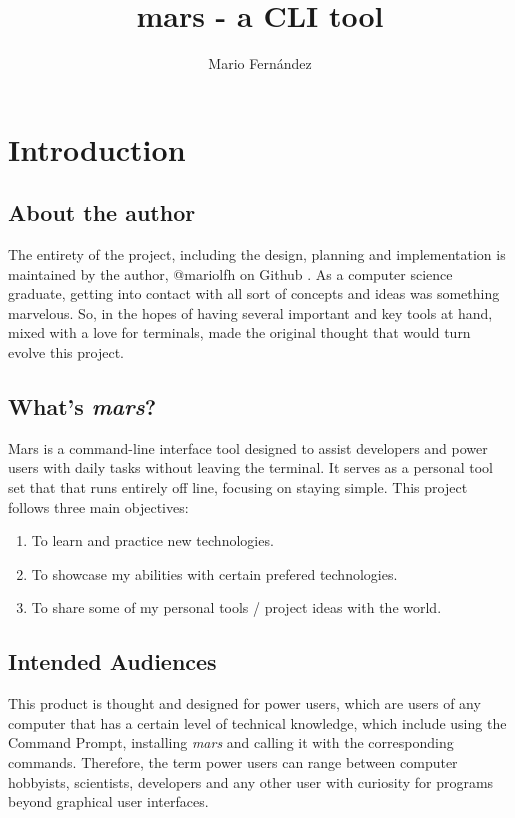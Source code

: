 \documentclass{report}
\title{mars - a CLI tool}
\author{Mario Fernández}
\begin{document}
\maketitle

\tableofcontents

\chapter{Introduction}
\section{About the author}
The entirety of the project, including the design, planning and implementation is maintained by the author, @mariolfh on Github \cite{githubinc.MariolfhOverview2025}. As a computer science graduate, getting into contact with all sort of concepts and ideas was something marvelous. So, in the hopes of having several important and key tools at hand, mixed with a love for terminals, made the original thought that would turn evolve this project. 

\section{What's \emph{mars}?}
Mars is a command-line interface tool designed to assist developers and power users with daily tasks without leaving the terminal. It serves as a personal tool set that that runs entirely off line, focusing on staying simple.
This project follows three main objectives:
\begin{enumerate}
\item{To learn and practice new technologies.}
\item{To showcase my abilities with certain prefered technologies.}
\item{To share some of my personal tools / project ideas with the world.}
\end{enumerate}

\section{Intended Audiences}
This product is thought and designed for power users, which are users of any computer that has a certain level of technical knowledge, which include using the Command Prompt, installing \emph{mars} and calling it with the corresponding commands. Therefore, the term power users can range between computer hobbyists, scientists, developers and any other user with curiosity for programs beyond graphical user interfaces.
\end{document}
